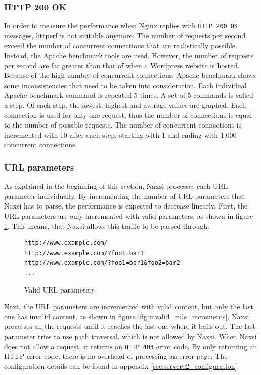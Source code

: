 \documentclass[Methods]{subfiles}
\begin{document}
\subsubsection{HTTP 200 OK}
\label{sec:HTTP 200 OK}
In order to measure the performance when Nginx replies with \verb+HTTP 200 OK+ messages, httperf is not suitable anymore. The number of requests per second exceed the number of concurrent connections that are realistically possible. Instead, the Apache benchmark tools are used. However, the number of requests per second are far greater than that of when a Wordpress website is hosted. Because of the high number of concurrent connections, Apache benchmark shows some inconsistencies that need to be taken into consideration. Each individual Apache benchmark command is repeated 5 times. A set of 5 commands is called a step. Of each step, the lowest, highest and average values are graphed. Each connection is used for only one request, thus the number of connections is equal to the number of possible requests. The number of concurrent connections is incremented with 10 after each step, starting with 1 and ending with 1,000 concurrent connections.

\subsubsection{URL parameters}
As explained in the beginning of this section, Naxsi processes each \ac{URL} parameter individually. By incrementing the number of \ac{URL} parameters that Naxsi has to parse, the performance is expected to decrease linearly. First, the \ac{URL} parameters are only incremented with valid parameters, as shown in figure \ref{fig:valid_rule_increments}. This means, that Naxsi allows this traffic to be passed through. 

\begin{figure}[H]
\caption{Valid URL parameters}
\begin{verbatim}
http://www.example.com/
http://www.example.com/?foo1=bar1
http://www.example.com/?foo1=bar1&foo2=bar2
...
\end{verbatim}
\label{fig:valid_rule_increments}
\end{figure}

Next, the \ac{URL} parameters are incremented with valid content, but only the last one has invalid content, as shown in figure \ref{fig:invalid_rule_increments}. Naxsi processes all the requests until it reaches the last one where it bails out. The last parameter tries to use path traversal, which is not allowed by Naxsi. When Naxsi does not allow a request, it returns an \verb+HTTP 403+ error code. By only returning an HTTP error code, there is no overhead of processing an error page. The configuration details can be found in appendix \ref{sec:server02_configuration}.
\end{document}
